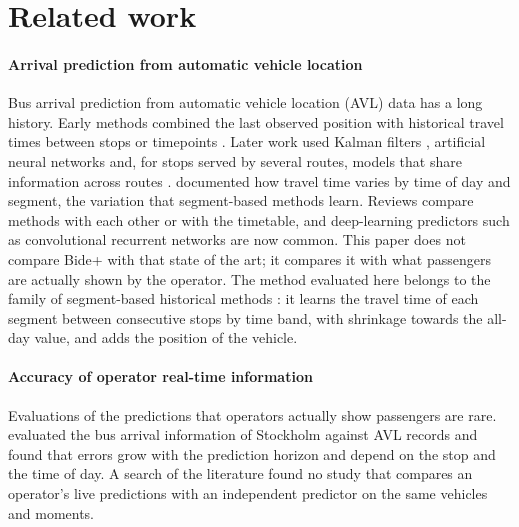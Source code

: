 \section{Related work}
\label{sec:related}

\paragraph{Arrival prediction from automatic vehicle location} Bus arrival prediction from automatic vehicle location
(AVL) data has a long history. Early methods combined the last observed position with historical travel times between
stops or timepoints \parencite{lin1999experimental,cathey2003prescription}. Later work used Kalman filters
\parencite{cathey2003prescription,shalaby2004,vanajakshi2009kalman}, artificial neural networks
\parencite{chien2002,jeong2005} and, for stops served by several routes, models that share information across routes
\parencite{yu2011multiple}. \textcite{mazloumi2010variability} documented how travel time varies by time of day and
segment, the variation that segment-based methods learn. Reviews \parencite{moreiramatias2015survey,singh2022review,kumar2025review}
compare methods with each other or with the timetable, and deep-learning predictors such as convolutional recurrent
networks \parencite{petersen2019convlstm} are now common. This paper does not compare Bide+ with that state of the
art; it compares it with what passengers are actually shown by the operator. The method evaluated here belongs to the family of
segment-based historical methods \parencite{lin1999experimental,cathey2003prescription}: it learns the travel time of
each segment between consecutive stops by time band, with shrinkage towards the all-day value, and adds the position of
the vehicle.

\paragraph{Accuracy of operator real-time information} Evaluations of the predictions that operators actually show
passengers are rare. \textcite{cats2016realtime} evaluated the bus arrival information of Stockholm against AVL records
and found that errors grow with the prediction horizon and depend on the stop and the time of day. A search of the literature found no study that
compares an operator's live predictions with an independent predictor on the same vehicles and moments.

